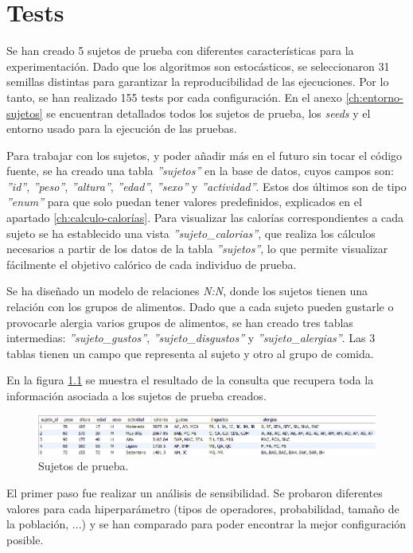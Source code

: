 \chapter{Tests}
\label{ch:tests}

Se han creado 5 sujetos de prueba con diferentes características para la experimentación. Dado que los algoritmos son estocásticos, se seleccionaron 31 semillas distintas para garantizar la reproducibilidad de las ejecuciones. Por lo tanto, se han realizado 155 tests por cada configuración. En el anexo \ref{ch:entorno-sujetos} se encuentran detallados todos los sujetos de prueba, los \textit{seeds} y el entorno usado para la ejecución de las pruebas.

Para trabajar con los sujetos, y poder añadir más en el futuro sin tocar el código fuente, se ha creado una tabla \textit{''sujetos''} en la base de datos, cuyos campos son: \textit{''id''}, \textit{''peso''}, \textit{''altura''}, \textit{''edad''}, \textit{''sexo''} y \textit{''actividad''}. Estos dos últimos son de tipo \textit{''enum''} para que solo puedan tener valores predefinidos, explicados en el apartado \ref{ch:calculo-calorías}. Para visualizar las calorías correspondientes a cada sujeto se ha establecido una vista \textit{''sujeto\_calorias''}, que realiza los cálculos necesarios a partir de los datos de la tabla \textit{''sujetos''}, lo que permite visualizar fácilmente el objetivo calórico de cada individuo de prueba.

Se ha diseñado un modelo de relaciones \textit{N:N}, donde los sujetos tienen una relación con los grupos de alimentos. Dado que a cada sujeto pueden gustarle o provocarle alergia varios grupos de alimentos, se han creado tres tablas intermedias: \textit{''sujeto\_gustos''}, \textit{''sujeto\_disgustos''} y \textit{''sujeto\_alergias''}. Las 3 tablas tienen un campo que representa al sujeto y otro al grupo de comida.

En la figura \ref{fig:sujetos-prueba} se muestra el resultado de la consulta que recupera toda la información asociada a los sujetos de prueba creados.
\begin{figure}[H]
    \centering
    \includegraphics[width=1\textwidth]{figures/sujetos_prueba.png}
    \caption{Sujetos de prueba.}
    \label{fig:sujetos-prueba}
\end{figure}
\newpage
El primer paso fue realizar un análisis de sensibilidad. Se probaron diferentes valores para cada hiperparámetro (tipos de operadores, probabilidad, tamaño de la población, ...) y se han comparado para poder encontrar la mejor configuración posible.

